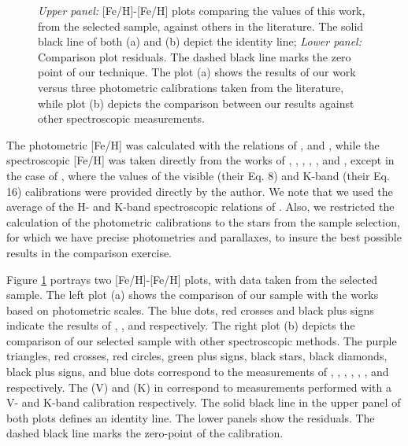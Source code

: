 \documentclass{aa}
\begin{document}
\begin{figure}[]
\begin{center}
\end{center}
\caption{\textit{Upper panel:} [Fe/H]-[Fe/H] plots comparing the values of this work, from the selected sample, against others in the literature. The solid black line of both (a) and (b) depict the identity line; \textit{Lower panel:} Comparison plot residuals. The dashed black line marks the zero point of our technique. The plot (a) shows the results of our work versus three photometric calibrations taken from the literature, while plot (b) depicts the comparison between our results against other spectroscopic measurements.}
\label{fig:compfeh}
\end{figure}


The photometric [Fe/H] was calculated with the relations of \citet{Bonfils-2005}, \citet{Schlaufman-2010} and \citet{Johnson-2012}, while the spectroscopic [Fe/H] was taken directly from the works of \citet{Woolf-2005}, \citet{Rojas-Ayala-2012}, \citet{Onehag-2012}, \citet{Terrien-2012}, \citet{Newton-2013}, and \citet{Mann-2013b}, except in the case of \citet{Mann-2013a}, where the values of the visible (their Eq. 8) and K-band (their Eq. 16) calibrations were provided directly by the author. We note that we used the average of the H- and K-band spectroscopic relations of \citet{Terrien-2012}. Also, we restricted the calculation of the photometric calibrations to the stars from the sample selection, for which we have precise photometries and parallaxes, to insure the best possible results in the comparison exercise.

Figure \ref{fig:compfeh} portrays two [Fe/H]-[Fe/H] plots, with data taken from the selected sample. The left plot (a) shows the comparison of our sample with the works based on photometric scales. The blue dots, red crosses and black plus signs indicate the results of \citet{Bonfils-2005}, \citet{Schlaufman-2010}, and \citet{Johnson-2012} respectively. The right plot (b) depicts the comparison of our selected sample with other spectroscopic methods. The purple triangles, red crosses, red circles, green plus signs, black stars, black diamonds, black plus signs, and blue dots correspond to the measurements of \citet[][]{Woolf-2005}, \citet{Rojas-Ayala-2012}, \citet{Onehag-2012}, \citet{Terrien-2012}, \citet{Mann-2013a}, \citet{Mann-2013b}, and \citet{Newton-2013} respectively. The (V) and (K) in \citet{Mann-2013a} correspond to measurements performed with a V- and K-band calibration respectively. The solid black line in the upper panel of both plots defines an identity line. The lower panels show the residuals. The dashed black line marks the zero-point of the calibration.
\end{document}
